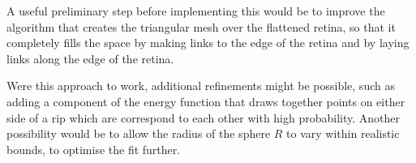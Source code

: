 \documentclass{article}
\begin{document}
A useful preliminary step before implementing this would be to improve
the algorithm that creates the triangular mesh over the flattened
retina, so that it completely fills the space by making links to the
edge of the retina and by laying links along the edge of the retina.

Were this approach to work, additional refinements might be possible,
such as adding a component of the energy function that draws together
points on either side of a rip which are correspond to each other with
high probability. Another possibility would be to allow the radius of
the sphere $R$ to vary within realistic bounds, to optimise the fit
further.
\end{document}
